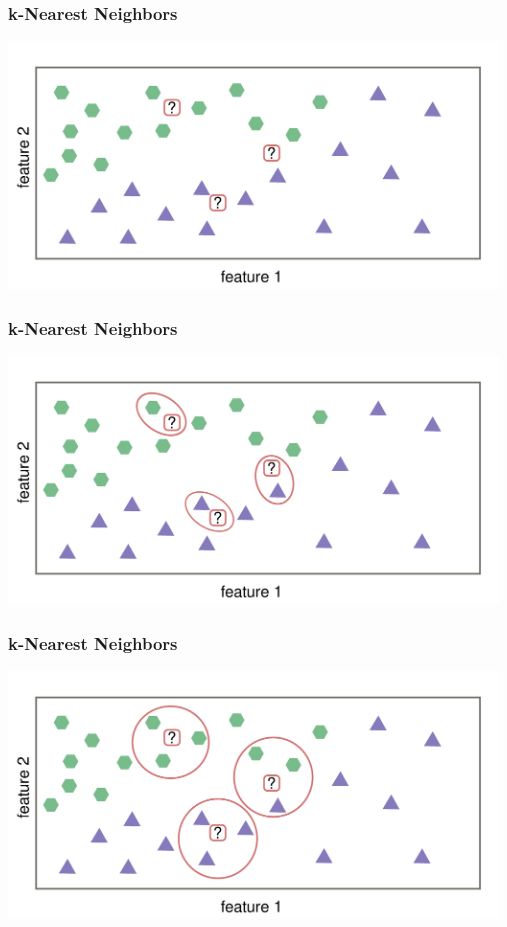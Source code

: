 \documentclass[aspectratio=169]{beamer}
\begin{document}
\begin{frame}
  \frametitle{k-Nearest Neighbors}
  \begin{center}
    \includegraphics[width=13.0cm]{images/k_nearest_neighbour_classification_only_training_data.pdf}
  \end{center}
\end{frame}

\begin{frame}
  \frametitle{k-Nearest Neighbors}
  \begin{center}
    \includegraphics[width=13.0cm]{images/k_nearest_neighbour_classification_k_1.pdf}
  \end{center}
\end{frame}

\begin{frame}
  \frametitle{k-Nearest Neighbors}
  \begin{center}
    \includegraphics[width=13.0cm]{images/k_nearest_neighbour_classification_k_3.pdf}
  \end{center}
\end{frame}
\end{document}
